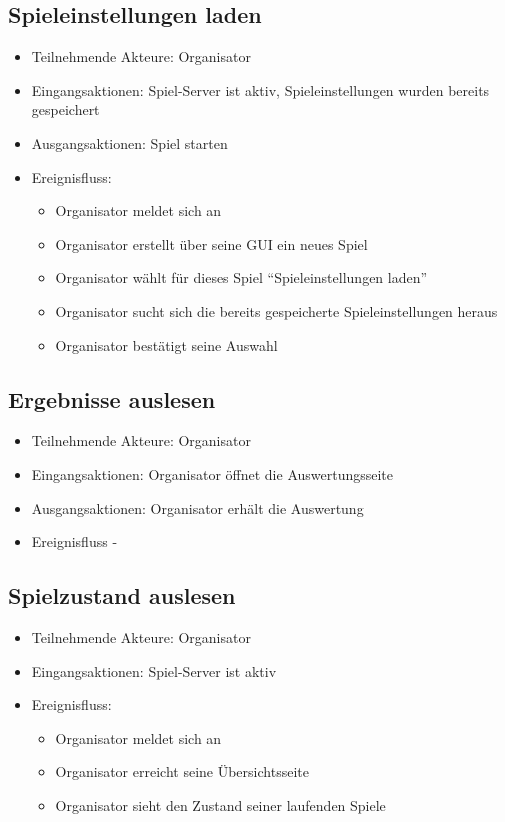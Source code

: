 \documentclass[a4paper]{scrreprt}
\begin{document}
    \subsection{Spieleinstellungen laden}
    \begin{itemize}
        \item Teilnehmende Akteure: \Gls{Organisator}
        \item Eingangsaktionen: \Gls{Spiel-Server} ist aktiv, \Gls{Spieleinstellungen} wurden bereits gespeichert
        \item Ausgangsaktionen: \Gls{Spiel} starten
        \item Ereignisfluss:
        \begin{itemize}
            \item \Gls{Organisator} meldet sich an
            \item \Gls{Organisator} erstellt über seine GUI ein neues Spiel
            \item \Gls{Organisator} wählt für dieses \Gls{Spiel} \enquote{Spieleinstellungen laden}
            \item \Gls{Organisator} sucht sich die bereits gespeicherte \Gls{Spieleinstellungen} heraus
            \item \Gls{Organisator} bestätigt seine Auswahl
        \end{itemize}
    \end{itemize}

    \subsection{Ergebnisse auslesen}

    \begin{itemize}
        \item Teilnehmende Akteure: \Gls{Organisator}
        \item Eingangsaktionen: \Gls{Organisator} öffnet die Auswertungsseite
        \item Ausgangsaktionen: \Gls{Organisator} erhält die Auswertung
        \item Ereignisfluss -
    \end{itemize}
 \subsection{Spielzustand auslesen}
	\begin{itemize}
		\item Teilnehmende Akteure: \Gls{Organisator}
		\item Eingangsaktionen: \Gls{Spiel-Server} ist aktiv
		\item Ereignisfluss:
		\begin{itemize}
			\item \Gls{Organisator} meldet sich an
			\item \Gls{Organisator} erreicht seine Übersichtsseite
			\item \Gls{Organisator} sieht den Zustand seiner laufenden Spiele
		\end{itemize}
	\end{itemize}
\end{document}
